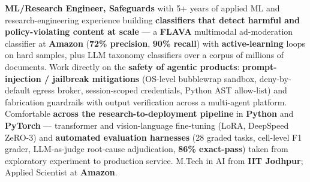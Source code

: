\documentclass[letter,10pt]{article}
\begin{document}

\textbf{ML/Research Engineer, Safeguards} with 5+ years of applied ML and research-engineering experience building \textbf{classifiers that detect harmful and policy-violating content at scale} --- a \textbf{FLAVA} multimodal ad-moderation classifier at \textbf{Amazon} (\textbf{72\% precision}, \textbf{90\% recall}) with \textbf{active-learning} loops on hard samples, plus LLM taxonomy classifiers over a corpus of millions of documents.
Work directly on the \textbf{safety of agentic products}: \textbf{prompt-injection / jailbreak mitigations} (OS-level bubblewrap sandbox, deny-by-default egress broker, session-scoped credentials, Python AST allow-list) and fabrication guardrails with output verification across a multi-agent platform.
Comfortable \textbf{across the research-to-deployment pipeline} in \textbf{Python} and \textbf{PyTorch} --- transformer and vision-language fine-tuning (LoRA, DeepSpeed ZeRO-3) and \textbf{automated evaluation harnesses} (28 graded tasks, cell-level F1 grader, LLM-as-judge root-cause adjudication, \textbf{86\% exact-pass}) taken from exploratory experiment to production service.
M.Tech in AI from \textbf{IIT Jodhpur}; Applied Scientist at \textbf{Amazon}.
\end{document}
